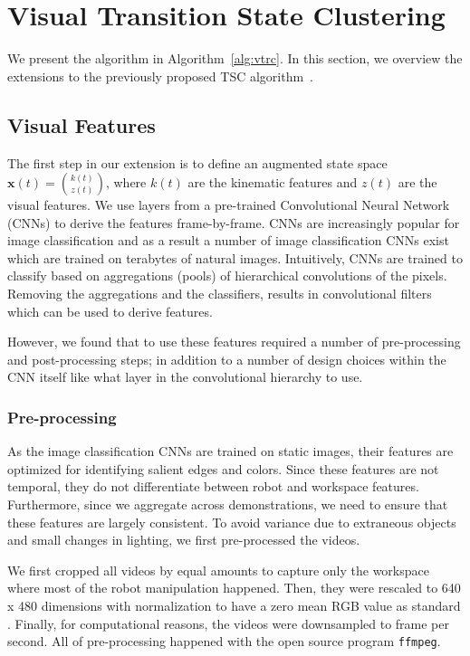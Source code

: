 \section{Visual Transition State Clustering}
We present the \tsc algorithm in Algorithm~\ref{alg:vtrc}.
In this section, we overview the extensions to the previously proposed TSC algorithm~\cite{krishnan2015tsc}.

\subsection{Visual Features}
The first step in our extension is to define an augmented state space $\mathbf{x}(t) = \binom{k(t)}{z(t)}$, where $k(t)$ are the kinematic features and $z(t)$ are the visual features.
We use layers from a pre-trained Convolutional Neural Network (CNNs) to derive the features frame-by-frame.
CNNs are increasingly popular for image classification and as a result a number of image classification CNNs exist which are trained on terabytes of natural images.
Intuitively, CNNs are trained to classify based on aggregations (pools) of hierarchical convolutions of the pixels.
Removing the aggregations and the classifiers, results in convolutional filters which can be used to derive features.

However, we found that to use these features required a number of pre-processing and post-processing steps; in addition to a number of design choices within the CNN itself like what layer in the convolutional hierarchy to use.

\subsubsection{Pre-processing}
As the image classification CNNs are trained on static images, their features are optimized for identifying salient edges and colors.
Since these features are not temporal, they do not differentiate between robot and workspace features.
Furthermore, since we aggregate across demonstrations, we need to ensure that these features are largely consistent.
To avoid variance due to extraneous objects and small changes in lighting, we first pre-processed the videos.

We first cropped all videos by equal amounts to capture only the workspace where most of the robot manipulation happened. 
Then, they were rescaled to 640 x 480 dimensions with normalization to have a zero mean RGB value as standard \cite{krizhevsky2012imagenet,simonyan2014very}. 
Finally, for computational reasons, the videos were downsampled to  frame per second.  
All of pre-processing happened with the open source program \texttt{ffmpeg}.

